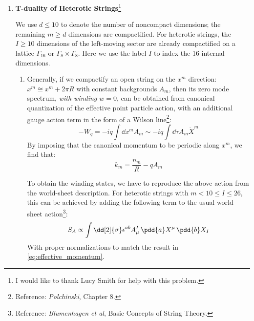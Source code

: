 \documentclass[a4paper,10pt]{article}
\begin{document}
\maketitle
\pagestyle{headings}
\thispagestyle{empty}


\begin{enumerate}

\item \textbf{T-duality of Heterotic Strings}\footnote{
		I would like to thank Lucy Smith for help with this problem. 
	}
	
	We use $d \le 10$ to denote the number of noncompact dimensions; the remaining $m \ge d$ dimensions are compactified. For heterotic strings, the $I\ge 10$ dimensions of the left-moving sector are already compactified on a lattice $\Gamma_{16}$ or $\Gamma_8\times \Gamma_8$. Here we use the label $I$ to index the 16 internal dimensions. 
	
	\begin{enumerate}
	\item Generally, if we compactify an open string on the $x^m$ direction: $x^m \cong x^m + 2\pi R$ with constant backgrounds $A_m$, then its zero mode spectrum, \textit{with winding $w = 0$}, can be obtained from canonical quantization of the effective point particle action, with an additional gauge action term in the form of a Wilson line\footnote{
		Reference: \textit{Polchinski}, Chapter 8. 
	}:
	\begin{equation}
		-W_q
		= -iq \int \dd{x^m} A_m
		\sim -iq \int \dd{\tau} A_m \dot{X}^m
	\end{equation}
	By imposing that the canonical momentum to be periodic along $x^m$, we find that:
	\begin{equation}
		k_m = \frac{n_m}{R} - q A_m
	\label{eq:effective_momentum}
	\end{equation}
	
	To obtain the winding states, we have to reproduce the above action from the world-sheet description. For heterotic strings with $m < 10 \le I \le 26$, this can be achieved by adding the following term to the usual world-sheet action\footnote{
		Reference: \textit{Blumenhagen et al}, Basic Concepts of String Theory. 
	}:
	\begin{equation}
		S_A \propto \int \dd[2]{\sigma}
			\epsilon^{ab} A^I_\mu
			\,\pdd{a} X^\mu
			\,\pdd{b} X_I
	\end{equation}
	With proper normalizations to match the result in \eqref{eq:effective_momentum}. 
	

\end{enumerate}
\end{enumerate}
\end{document}
